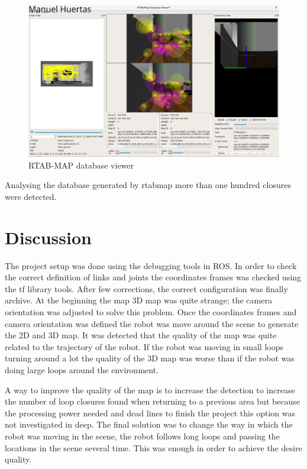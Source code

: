 \documentclass[10pt,journal,compsoc]{IEEEtran}
\begin{document}
\begin{figure}[h]
\centering
\includegraphics[scale=0.15]{RTAB-Map-Udacity}
\caption{RTAB-MAP database viewer}
\label{fig:world}
\end{figure}


Analysing the database generated by rtabmap more than one hundred closures were detected.

\section{Discussion}
The project setup was done using the debugging tools in ROS. In order to check the correct definition of links and joints the coordinates frames was checked using the tf library tools. After few corrections, the correct configuration was finally archive. At the beginning the map 3D map was quite strange; the camera orientation was adjusted to solve this problem. Once the coordinates frames and camera orientation was defined the robot was move around the scene to generate the 2D and 3D map. It was detected that the quality of the map was quite related to the trajectory of the robot. If the robot was moving in small loops turning around a lot the quality of the 3D map was worse than if the robot was doing large loops around the environment.

A way to improve the quality of the map is to increase the detection to increase the number of loop closures found when returning to a previous area but because the processing power needed and dead lines to finish the project this option was not investigated in deep. The final solution was to change the way in which the robot was moving in the scene, the robot follows long loops and passing the locations in the scene several time. This was enough in order to achieve the desire quality.
\end{document}
